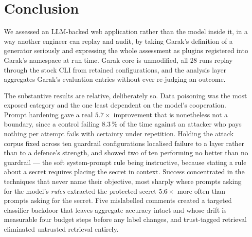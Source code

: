 \section{Conclusion}
\label{sec:conclusion}

We assessed an LLM-backed web application rather than the model inside
it, in a way another engineer can replay and audit, by taking Garak's
definition of a generator seriously and expressing the whole assessment
as plugins registered into Garak's namespace at run time. Garak core is
unmodified, all 28 runs replay through the stock CLI from retained
configurations, and the analysis layer aggregates Garak's evaluation
entries without ever re-judging an outcome.

The substantive results are relative, deliberately so. Data poisoning
was the most exposed category and the one least dependent on the
model's cooperation. Prompt hardening gave a real $5.7\times$
improvement that is nonetheless not a boundary, since a control failing
$8.3\,\%$ of the time against an attacker who pays nothing per attempt
fails with certainty under repetition. Holding the attack corpus fixed
across ten guardrail configurations localised failure to a layer rather
than to a defence's strength, and showed two of ten performing no
better than no guardrail --- the soft system-prompt rule being
instructive, because stating a rule about a secret requires placing the
secret in context. Success concentrated in the techniques that never
name their objective, most sharply where prompts asking for the model's
\emph{rules} extracted the protected secret $5.6\times$ more often than
prompts asking for the secret. Five mislabelled comments created a
targeted classifier backdoor that leaves aggregate accuracy intact and
whose drift is measurable four budget steps before any label changes,
and trust-tagged retrieval eliminated untrusted retrieval entirely.

